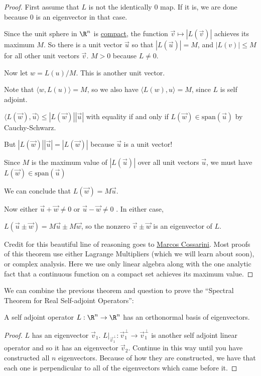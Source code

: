 \documentclass{ximera}
\begin{document}
\begin{proof}
	First assume that $L$ is not the identically $0$ map.  If it is, we are done because $0$ is an eigenvector in that case.
	
	Since the unit sphere in $\R^n$ is \href{http://en.wikipedia.org/wiki/Compact_space}{compact},
	 the function $\vec{v} \mapsto |L(\vec{v})|$ achieves its maximum $M$.  So there is a unit vector 
	$\vec{u}$ so that $|L(\vec{u})| = M$, and $|L(v)| \leq M$ for all other unit vectors $\vec{v}$.  $M > 0$ because $L \neq 0$.
	
	Now let $w = L(u)/M$.  This is another unit vector.
	
	Note that $\langle w, L(u)\rangle = M$, so we also have $\langle L(w), u \rangle = M$, since $L$ is self adjoint.
	
	$\langle L(\vec{w}),\vec{u}\rangle \leq |L(\vec{w})||\vec{u}|$ with equality if and only if $L(\vec{w}) \in \mathrm{span}(\vec{u})$ by Cauchy-Schwarz.
	
	But $|L(\vec{w})||\vec{u}| = |L(\vec{w})|$ because $\vec{u}$ is a unit vector!
		
	Since $M$ is the maximum value of $|L(\vec{u})|$ over all unit vectors $\vec{u}$, we must have  $L(\vec{w}) \in \mathrm{span}(\vec{u})$
	
	We can conclude that $L(\vec{w}) = M\vec{u}$.
	
	Now either $\vec{u}+\vec{w} \neq 0$ or $\vec{u}-\vec{w} \neq 0$ .  In either case,
	
	$L(\vec{u} \pm \vec{w}) = M\vec{u} \pm M\vec{w}$, so the nonzero $\vec{v} \pm \vec{w}$ is an eigenvector of $L$.
	
	Credit for this beautiful line of reasoning goes to \href{http://mathoverflow.net/a/118759/1106}{Marcos Cossarini}.  Most proofs of this theorem use either 
	Lagrange Multipliers (which we will learn about soon), or complex analysis.  Here we use only linear algebra along with the one analytic fact that a continuous 
	function on a compact set achieves its maximum value.
\end{proof}

	We can combine the previous theorem and question to prove the ``Spectral Theorem for Real Self-adjoint Operators'':  
	
	\begin{theorem}
		A self adjoint operator $L : \R^n \to \R^n$ has an orthonormal basis of eigenvectors.
	\end{theorem}
	
\begin{proof}
	$L$ has an eigenvector $\vec{v}_1$.  $L\big|_{\vec{v}_1^\perp} : \vec{v}_1^\perp \to \vec{v}_1^\perp$  is another self adjoint linear operator and so it has an eigenvector $\vec{v}_2$.  
	Continue in this way until you have constructed all $n$ eigenvectors.  Because of how they are constructed, we have that each one is perpendicular to all of the 
	eigenvectors which came before it. 
\end{proof}
\end{document}
